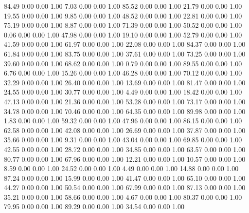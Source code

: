    84.49   0.00   0.00   1.00
    7.03   0.00   0.00   1.00
   85.52   0.00   0.00   1.00
   21.79   0.00   0.00   1.00
   19.55   0.00   0.00   1.00
    9.85   0.00   0.00   1.00
   48.52   0.00   0.00   1.00
   22.81   0.00   0.00   1.00
   75.19   0.00   0.00   1.00
    8.87   0.00   0.00   1.00
   71.39   0.00   0.00   1.00
   50.52   0.00   0.00   1.00
    0.06   0.00   0.00   1.00
   47.98   0.00   0.00   1.00
   19.10   0.00   0.00   1.00
   52.79   0.00   0.00   1.00
   41.59   0.00   0.00   1.00
   61.97   0.00   0.00   1.00
   22.08   0.00   0.00   1.00
   84.37   0.00   0.00   1.00
   61.84   0.00   0.00   1.00
   83.75   0.00   0.00   1.00
   37.61   0.00   0.00   1.00
   73.25   0.00   0.00   1.00
   39.60   0.00   0.00   1.00
   68.62   0.00   0.00   1.00
    0.79   0.00   0.00   1.00
   89.55   0.00   0.00   1.00
    6.76   0.00   0.00   1.00
   15.26   0.00   0.00   1.00
   46.28   0.00   0.00   1.00
   70.12   0.00   0.00   1.00
   32.29   0.00   0.00   1.00
   26.40   0.00   0.00   1.00
   13.69   0.00   0.00   1.00
   81.47   0.00   0.00   1.00
   24.55   0.00   0.00   1.00
   30.77   0.00   0.00   1.00
    4.49   0.00   0.00   1.00
   18.42   0.00   0.00   1.00
   47.13   0.00   0.00   1.00
   21.36   0.00   0.00   1.00
   53.28   0.00   0.00   1.00
   73.17   0.00   0.00   1.00
   34.78   0.00   0.00   1.00
   70.46   0.00   0.00   1.00
   64.35   0.00   0.00   1.00
   89.98   0.00   0.00   1.00
    1.83   0.00   0.00   1.00
   59.32   0.00   0.00   1.00
   47.96   0.00   0.00   1.00
   86.15   0.00   0.00   1.00
   62.58   0.00   0.00   1.00
   42.08   0.00   0.00   1.00
   26.69   0.00   0.00   1.00
   37.87   0.00   0.00   1.00
   35.66   0.00   0.00   1.00
    9.31   0.00   0.00   1.00
   43.04   0.00   0.00   1.00
   69.85   0.00   0.00   1.00
   42.55   0.00   0.00   1.00
   28.72   0.00   0.00   1.00
   34.85   0.00   0.00   1.00
   63.57   0.00   0.00   1.00
   80.77   0.00   0.00   1.00
   67.96   0.00   0.00   1.00
   12.21   0.00   0.00   1.00
   10.57   0.00   0.00   1.00
    8.59   0.00   0.00   1.00
   24.52   0.00   0.00   1.00
    4.49   0.00   0.00   1.00
   14.88   0.00   0.00   1.00
   87.24   0.00   0.00   1.00
   15.99   0.00   0.00   1.00
   41.47   0.00   0.00   1.00
   65.10   0.00   0.00   1.00
   44.27   0.00   0.00   1.00
   50.54   0.00   0.00   1.00
   67.99   0.00   0.00   1.00
   87.13   0.00   0.00   1.00
   35.21   0.00   0.00   1.00
   58.66   0.00   0.00   1.00
    4.67   0.00   0.00   1.00
   80.37   0.00   0.00   1.00
   79.95   0.00   0.00   1.00
   89.29   0.00   0.00   1.00
   34.54   0.00   0.00   1.00
